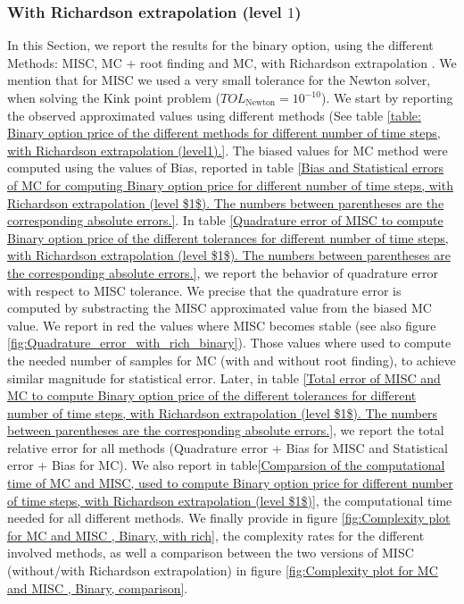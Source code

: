 \documentclass[11pt]{article}
\begin{document}
\FloatBarrier

\subsubsection*{With Richardson extrapolation (level $1$)}
In this Section, we report the results for the binary option, using the different Methods: MISC, MC $+$ root finding  and MC, with Richardson extrapolation . We mention that for MISC we used a very small tolerance for the Newton solver, when solving the Kink point problem ($TOL_{\text{Newton}}=10^{-10}$). We start by reporting the observed approximated values using different methods (See table \ref{table: Binary option price of the different methods for different number of time steps, with Richardson extrapolation (level1).}. The biased values for MC method were computed using the values of Bias, reported in table \ref{Bias and Statistical errors of MC  for computing Binary option price  for different number of time steps, with Richardson extrapolation (level $1$). The numbers between parentheses are the corresponding absolute errors.}. In table \ref{Quadrature error of MISC to compute Binary option price of the different tolerances for different number of time steps, with Richardson extrapolation (level $1$). The numbers between parentheses are the corresponding absolute errors.}, we report the behavior of quadrature error with respect to MISC tolerance. We precise that the quadrature error is computed by substracting the MISC approximated value from the biased MC value. We report in red the values where MISC becomes stable (see also figure \ref{fig:Quadrature_error_with_rich_binary}). Those values where used to compute the needed number of samples for MC (with and without root finding), to achieve similar magnitude  for statistical error. Later, in table \ref{Total error of MISC and MC to compute Binary option price of the different tolerances for different number of time steps, with Richardson extrapolation (level $1$). The numbers between parentheses are the corresponding absolute errors.}, we report the total relative error for all methods (Quadrature error + Bias for MISC and Statistical error + Bias for MC). We also report in table\ref{Comparsion of the computational time of  MC and MISC, used to compute Binary option price  for different number of time steps, with Richardson extrapolation (level $1$)}, the computational time needed for all different methods.  We finally provide in figure \ref{fig:Complexity plot for MC and MISC , Binary, with rich}, the complexity rates for the different involved methods, as well a comparison between the two versions of MISC (without/with Richardson extrapolation) in figure \ref{fig:Complexity plot for MC and MISC , Binary, comparison}.
\end{document}
